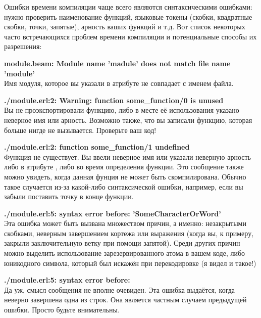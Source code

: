 Ошибки времени компиляции чаще всего являются синтаксическими ошибками: нужно проверить наименование функций, языковые токены (скобки, квадратные скобки, точки, запятые), арность ваших функций и т.д.
Вот список некоторых часто встречающихся проблем времени компиляции и потенциальные способы их разрешения:

\blankline
\begin{minipage}{\textwidth}
\textbf{module.beam: Module name 'madule' does not match file name 'module'}\\
Имя модуля, которое вы указали в атрибуте  не совпадает с именем файла.
\end{minipage}

\blankline
\begin{minipage}{\textwidth}
\textbf{./module.erl:2: Warning: function some\_function/0 is unused}\\ 
Вы не проэкспортировали функцию, либо в месте её использования указано неверное имя или арность.
Возможно также, что вы записали функцию, которая больше нигде не вызывается.
Проверьте ваш код!
\end{minipage}

\blankline
\begin{minipage}{\textwidth}
\textbf{./module.erl:2: function some\_function/1 undefined}\\ 
Функция не существует.
Вы ввели неверное имя или указали неверную арность либо в атрибуте , либо во время определения функции.
Это сообщение также можно увидеть, когда данная фунция не может быть скомпилирована.
Обычно такое случается из\--за какой\--либо синтаксической ошибки, например, если вы забыли поставить точку в конце функции.
\end{minipage}

\blankline
\begin{minipage}{\textwidth}
\textbf{./module.erl:5: syntax error before: 'SomeCharacterOrWord'}\\ 
Эта ошибка может быть вызвана множеством причин, а именно: незакрытыми скобками, неверным завершением кортежа или выражения (когда вы, к примеру, закрыли заключительную ветку  при помощи запятой).
Среди других причин можно выделить использование зарезервированного атома в вашем коде, либо юникодного символа, который был искажён при перекодировке (я видел и такое!)
\end{minipage}

\blankline
\begin{minipage}{\textwidth}
\textbf{./module.erl:5: syntax error before: }\\ 
Да уж, смысл сообщения не вполне очевиден.
Эта ошибка выдаётся, когда неверно завершена одна из строк.
Она является частным случаем предыдущей ошибки.
Просто будьте внимательны.
\end{minipage}

